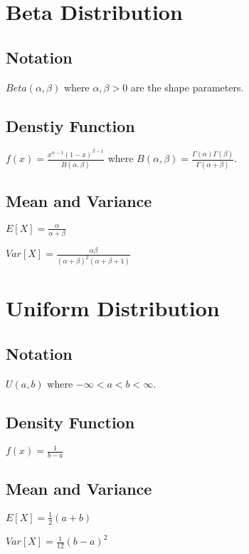 \documentclass{article}
\begin{document}
\begin{multicols*}{2}

\section{Beta Distribution}
\label{sec:beta-dist}

\subsection{Notation}

$Beta(\alpha, \beta)$ where $\alpha,\beta > 0$ are the shape parameters.

\subsection{Denstiy Function}

$f(x) = \frac{x^{\alpha - 1} (1 - x)^{\beta - 1}}{B(\alpha,\beta)}$ where $B(\alpha, \beta) = \frac{\Gamma(\alpha)\Gamma(\beta)}{\Gamma(\alpha + \beta)}$.

\subsection{Mean and Variance}

$E[X] = \frac{\alpha}{\alpha + \beta}$

$Var[X] = \frac{\alpha \beta}{(\alpha + \beta)^2(\alpha + \beta + 1)}$

\section{Uniform Distribution}
\label{sec:uniform-dist}

\subsection{Notation}

$U(a,b)$ where $-\infty < a < b < \infty$.

\subsection{Density Function}

$f(x) = \frac{1}{b - a}$

\subsection{Mean and Variance}

$E[X] = \frac{1}{2}(a + b)$

$Var[X] = \frac{1}{12}(b - a)^2$

\end{multicols*}
\end{document}

